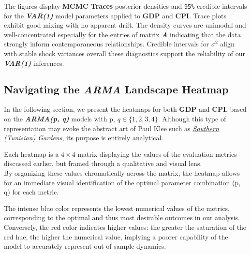 \documentclass{Configuration_Files/PoliMi3i_thesis}
\begin{document}
The figures display \textbf{MCMC Traces} posterior densities and \texttt{95\%} credible intervals for the \textbf{\textit{VAR(1)}} model parameters applied to \textbf{GDP} and \textbf{CPI}. Trace plots exhibit good mixing with no apparent drift. The density curves are unimodal and well‐concentrated especially for the entries of matrix \textbf{\textit{A}} indicating that the data strongly inform contemporaneous relationships. Credible intervals for
\(\sigma^{2}\) align with stable shock variances overall these diagnostics support the reliability of our \textbf{\textit{VAR(1)}} inferences.
\newpage
\subsection{Navigating the \textbf{\textit{ARMA}} Landscape Heatmap}
In the following section, we present the heatmaps for both \textbf{GDP} and \textbf{CPI}, based on the \textbf{\textit{ARMA(p, q)}} models with p,  \(q \in \{1, 2, 3, 4\}\).
Although this type of representation may evoke the abstract art of Paul Klee such as \href{https://www.wikiart.org/en/paul-klee/southern-tunisian-gardens-1919}{\textit{Southern (Tunisian) Gardens}}, its purpose is entirely analytical.

Each heatmap is a \(4 \times 4\) matrix displaying the values of the evaluation metrics discussed earlier, but framed through a qualitative and visual lens.\\
By organizing these values chromatically across the matrix, the heatmap allows for an immediate visual identification of the optimal parameter combination (p, q) for each metric.

The intense blue color represents the lowest numerical values of the metrics, corresponding to the optimal and thus most desirable outcomes in our analysis. Conversely, the red color indicates higher values: the greater the saturation of the red hue, the higher the numerical value, implying a poorer capability of the model to accurately represent out-of-sample dynamics.
\end{document}
